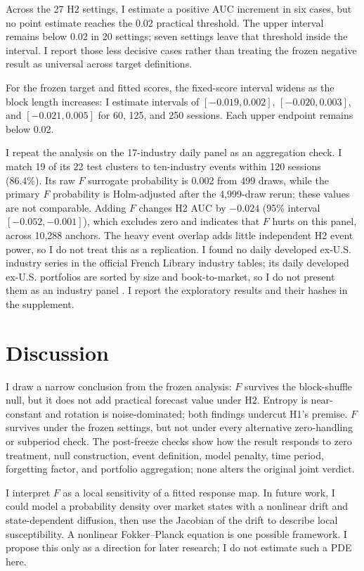 \documentclass[11pt]{article}
\begin{document}
Across the 27 H2 settings, I estimate a positive AUC increment in six cases, but no point estimate reaches the 0.02 practical threshold. The upper interval remains below 0.02 in 20 settings; seven settings leave that threshold inside the interval. I report those less decisive cases rather than treating the frozen negative result as universal across target definitions.

For the frozen target and fitted scores, the fixed-score interval widens as the block length increases: I estimate intervals of $[-0.019,0.002]$, $[-0.020,0.003]$, and $[-0.021,0.005]$ for 60, 125, and 250 sessions. Each upper endpoint remains below 0.02.

I repeat the analysis on the 17-industry daily panel as an aggregation check. I match 19 of its 22 test clusters to ten-industry events within 120 sessions (86.4\%). Its raw $F$ surrogate probability is 0.002 from 499 draws, while the primary $F$ probability is Holm-adjusted after the 4,999-draw rerun; these values are not comparable. Adding $F$ changes H2 AUC by $-0.024$ (95\% interval $[-0.052,-0.001]$), which excludes zero and indicates that $F$ hurts on this panel, across 10,288 anchors. The heavy event overlap adds little independent H2 event power, so I do not treat this as a replication. I found no daily developed ex-U.S. industry series in the official French Library industry tables; its daily developed ex-U.S. portfolios are sorted by size and book-to-market, so I do not present them as an industry panel \cite{French}. I report the exploratory results and their hashes in the supplement.

\section{Discussion}
I draw a narrow conclusion from the frozen analysis: $F$ survives the block-shuffle null, but it does not add practical forecast value under H2. Entropy is near-constant and rotation is noise-dominated; both findings undercut H1's premise. $F$ survives under the frozen settings, but not under every alternative zero-handling or subperiod check. The post-freeze checks show how the result responds to zero treatment, null construction, event definition, model penalty, time period, forgetting factor, and portfolio aggregation; none alters the original joint verdict.

I interpret $F$ as a local sensitivity of a fitted response map. In future work, I could model a probability density over market states with a nonlinear drift and state-dependent diffusion, then use the Jacobian of the drift to describe local susceptibility. A nonlinear Fokker--Planck equation is one possible framework. I propose this only as a direction for later research; I do not estimate such a PDE here.
\end{document}
